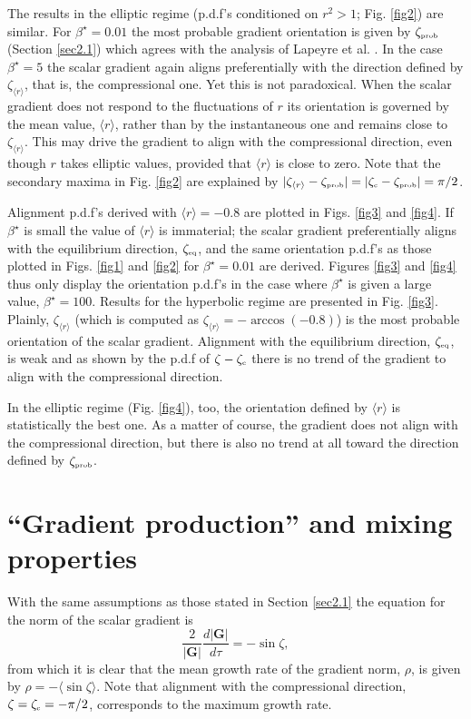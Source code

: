 \documentclass[doublespacing]{elsart}
\begin{document}
The results 
in the elliptic regime 
(p.d.f's conditioned on $ r^2 >1 $; Fig. \ref{fig2}) 
are similar.
For $ \beta^{\star} = 0.01 $ the most probable
gradient orientation 
is given by $ \zeta_{\mbox{\tiny prob}} $ (Section \ref{sec2.1})
which agrees with the analysis of Lapeyre et al. \cite{Lal99}.
In the case $ \beta^{\star} = 5 $ 
the scalar gradient again aligns preferentially with
the direction defined by $ \zeta_{\langle r \rangle} $,
that is, the compressional one.
Yet this is not paradoxical.
When the scalar gradient does not respond to the fluctuations
of $ r $ its orientation is governed by the mean value,
$ \langle r \rangle $, rather than by the instantaneous one 
and remains close to $ \zeta_{\langle r \rangle} $.
This may drive 
the gradient to align with the compressional direction,
even though $ r $ takes elliptic values,
provided that $ \langle r \rangle $ is close to zero.
Note that
the secondary maxima in Fig. \ref{fig2} are explained by
$ |\zeta_{\langle r \rangle} - \zeta_{\mbox{\tiny prob}}|
=
|\zeta_{\mbox{\tiny c}} - \zeta_{\mbox{\tiny prob}}|
= \pi/2 $.

Alignment p.d.f's derived with $ \langle r \rangle = -0.8 $
are plotted in Figs. \ref{fig3} and \ref{fig4}.
If
$ \beta^{\star} $ 
is small
the value of $ \langle r \rangle $ is immaterial; 
the scalar gradient preferentially aligns with the equilibrium
direction, $ \zeta_{\mbox{\tiny eq}} $, 
and the same orientation p.d.f's 
as those plotted in Figs. \ref{fig1} and
\ref{fig2} 
for $ \beta^{\star} = 0.01 $ are derived.
Figures \ref{fig3} and \ref{fig4} thus only display the orientation
p.d.f's in the case where 
$ \beta^{\star} $ is given a large value, $ \beta^{\star} = 100 $.
Results for the hyperbolic regime 
are presented in Fig. \ref{fig3}.
Plainly,
$ \zeta_{\langle r \rangle} $ (which is computed as 
$ \zeta_{\langle r \rangle} = -\arccos(-0.8) $)
is
the most probable orientation of the scalar gradient.
Alignment with the equilibrium direction,
$ \zeta_{\mbox{\tiny eq}} $, is weak and
as shown by the p.d.f of $ \zeta - \zeta_{\mbox{\tiny c}} $
there is no trend of the gradient to align with the
compressional direction.

In the elliptic regime (Fig. \ref{fig4}), too, the orientation
defined by $ \langle r \rangle $ is statistically the
best one.
As a matter of course, the gradient does not align with
the compressional direction, but there is also no trend at all toward
the direction defined by $ \zeta_{\mbox{\tiny prob}} $.
\section{``Gradient production'' and mixing properties}
\label{sec3}
With the same assumptions as those stated in Section \ref{sec2.1}
the equation for the norm of the scalar gradient is
\cite{Lal99,Lal01}
\[
\frac{2}{|\bm{G}|} \frac{d |\bm{G}|}{d \tau}
=
-\sin \zeta,
\]
from which it is clear that the mean growth rate of the
gradient norm, $ \rho $, is given by $ \rho = - \langle \sin \zeta \rangle $.
Note that alignment with the compressional direction,
$ \zeta = \zeta_{\mbox{\tiny c}} = - \pi/2 $,
corresponds to the maximum growth rate.
\end{document}
